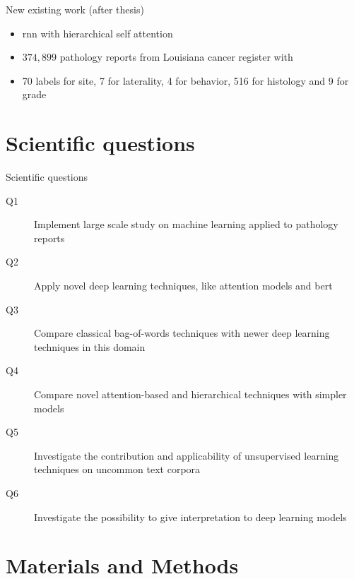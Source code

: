 \begin{frame}{New existing work (after thesis)}
  \begin{block}{\footnotesize{}}
    \begin{itemize}
      \footnotesize
    \item \alert{\acs{rnn}} with hierarchical self attention
    \item \alert{$374,899$} pathology reports from Louisiana
      cancer register with
    \item \alert{70} labels for site, \alert{7} for laterality,
      \alert{4} for 
      behavior, \alert{516} for histology and \alert{9} for grade
    \end{itemize}
  \end{block}
\end{frame}

\section{Scientific questions}

\begin{frame}{Scientific questions}
  \begin{description}
  \item[Q1] Implement \alert{large scale} study on machine learning
    applied to pathology reports
  \item[Q2] Apply \alert{novel} deep learning techniques, like
    \alert{attention} models and \alert{\acs{bert}}
  \item[Q3] \alert{Compare} classical \alert{bag-of-words} techniques with
    newer deep learning techniques in this domain
  \item[Q4] \alert{Compare} novel \alert{attention}-based and
    \alert{hierarchical} techniques with simpler models
  \item[Q5] \alert{Investigate} the contribution and applicability of
    \alert{unsupervised} learning techniques on uncommon text corpora
  \item[Q6] \alert{Investigate} the possibility to give
    \alert{interpretation} to deep learning models
  \end{description}
\end{frame}

\section{Materials and Methods}

